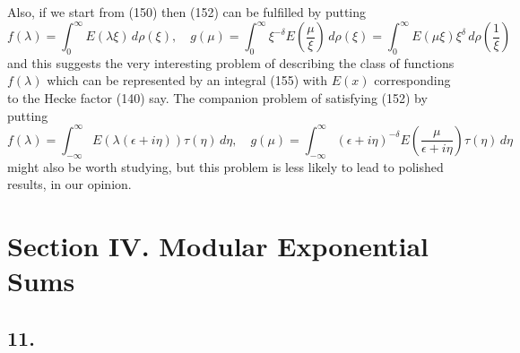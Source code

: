 \documentclass[12pt]{article}
\begin{document}
Also, if we start from (150) then (152) can be fulfilled by putting
\begin{equation}
f(\lambda) = \int_0^{\infty} E(\lambda\xi) \, d\rho(\xi), \quad
g(\mu) = \int_0^{\infty} \xi^{-\delta} E\left( \frac{\mu}{\xi} \right) \, d\rho(\xi) = \int_0^{\infty} E(\mu\xi)\xi^\delta \, d\rho \left( \frac{1}{\xi} \right)
\tag{155}
\end{equation}
and this suggests the very interesting problem of describing the class of functions \(f(\lambda)\) which can be represented by an integral (155) with \(E(x)\) corresponding to the Hecke factor (140) say. The companion problem of satisfying (152) by putting
\[
f(\lambda) = \int_{-\infty}^{\infty} E(\lambda(\epsilon + i\eta))\tau(\eta) \, d\eta, \quad
g(\mu) = \int_{-\infty}^{\infty} (\epsilon + i\eta)^{-\delta} E\left( \frac{\mu}{\epsilon + i\eta} \right) \tau(\eta) \, d\eta
\]
might also be worth studying, but this problem is less likely to lead to polished results, in our opinion.

\section*{Section IV. Modular Exponential Sums}

\subsection*{11.}
\end{document}

